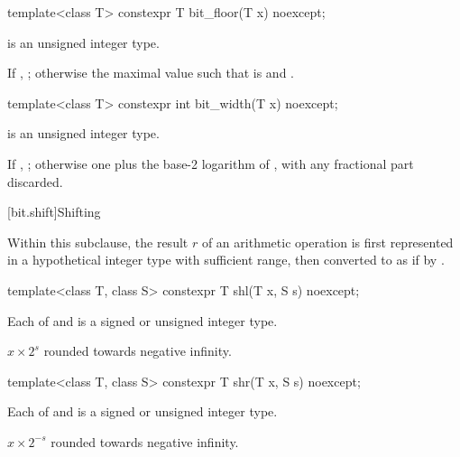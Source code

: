 %
\begin{itemdecl}
template<class T>
  constexpr T bit_floor(T x) noexcept;
\end{itemdecl}

\begin{itemdescr}
\pnum
\constraints
{} is an unsigned integer type.

\pnum
\returns
If , ;
otherwise the maximal value 
such that  is  and .

\end{itemdescr}

%
\begin{itemdecl}
template<class T>
  constexpr int bit_width(T x) noexcept;
\end{itemdecl}

\begin{itemdescr}
\pnum
\constraints
{} is an unsigned integer type.

\pnum
\returns
If , ;
otherwise one plus the base-2 logarithm of ,
with any fractional part discarded.

\end{itemdescr}

[bit.shift]{Shifting}

\pnum
Within this subclause,
the result $r$ of an arithmetic operation is
first represented in a hypothetical integer type with sufficient range,
then converted to  as if by .

%
\begin{itemdecl}
template<class T, class S>
  constexpr T shl(T x, S s) noexcept;
\end{itemdecl}

\begin{itemdescr}
\pnum
\constraints
Each of  and 
is a signed or unsigned integer type.

\pnum
\returns
$x \times 2^s$ rounded towards negative infinity.
\end{itemdescr}

%
\begin{itemdecl}
template<class T, class S>
  constexpr T shr(T x, S s) noexcept;
\end{itemdecl}

\begin{itemdescr}
\pnum
\constraints
Each of  and 
is a signed or unsigned integer type.

\pnum
\returns
$x \times 2^{-s}$ rounded towards negative infinity.
\end{itemdescr}

